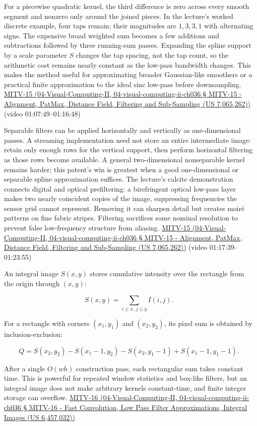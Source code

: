For a piecewise quadratic kernel, the third difference is zero across every smooth segment and nonzero only around the joined pieces. In the lecture's worked discrete example, four taps remain; their magnitudes are \(1,3,3,1\) with alternating signs. The expensive broad weighted sum becomes a few additions and subtractions followed by three running-sum passes. Expanding the spline support by a scale parameter \(S\) changes the tap spacing, not the tap count, so the arithmetic cost remains nearly constant as the low-pass bandwidth changes. This makes the method useful for approximating broader Gaussian-like smoothers or a practical finite approximation to the ideal sinc low-pass before downsampling. \href{}{MITV-15 (04-Visual-Computing-II, 04-visual-computing-ii-ch036 § MITV-15 - Alignment, PatMax, Distance Field, Filtering and Sub-Sampling (US 7,065,262))} (video 01:07:49--01:16:48)

Separable filters can be applied horizontally and vertically as one-dimensional passes. A streaming implementation need not store an entire intermediate image: retain only enough rows for the vertical support, then perform horizontal filtering as those rows become available. A general two-dimensional nonseparable kernel remains harder; this patent's win is greatest when a good one-dimensional or separable spline approximation suffices. The lecture's calcite demonstration connects digital and optical prefiltering: a birefringent optical low-pass layer makes two nearly coincident copies of the image, suppressing frequencies the sensor grid cannot represent. Removing it can sharpen detail but creates moiré patterns on fine fabric stripes. Filtering sacrifices some nominal resolution to prevent false low-frequency structure from aliasing. \href{}{MITV-15 (04-Visual-Computing-II, 04-visual-computing-ii-ch036 § MITV-15 - Alignment, PatMax, Distance Field, Filtering and Sub-Sampling (US 7,065,262))} (video 01:17:39--01:23:55)

An integral image \(S(x,y)\) stores cumulative intensity over the rectangle from the origin through \((x,y)\):

\[
S(x,y)=\sum_{i\le x,\,j\le y}I(i,j).
\]

For a rectangle with corners \((x_1,y_1)\) and \((x_2,y_2)\), its pixel sum is obtained by inclusion-exclusion:

\[
Q=S(x_2,y_2)-S(x_1-1,y_2)-S(x_2,y_1-1)+S(x_1-1,y_1-1).
\]

After a single \(O(wh)\) construction pass, each rectangular sum takes constant time. This is powerful for repeated window statistics and box-like filters, but an integral image does not make arbitrary kernels constant-time, and finite integer storage can overflow. \href{}{MITV-16 (04-Visual-Computing-II, 04-visual-computing-ii-ch036 § MITV-16 - Fast Convolution, Low Pass Filter Approximations, Integral Images (US 6,457,032))}


